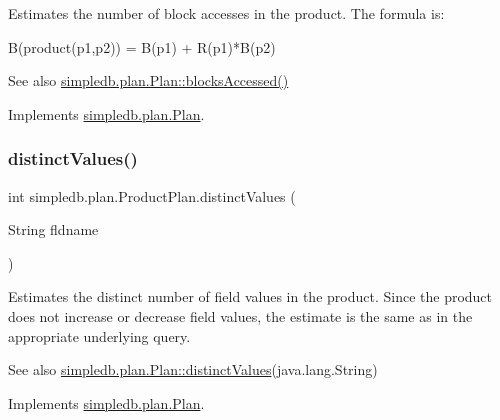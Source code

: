 Estimates the number of block accesses in the product. The formula is\+: 
\begin{DoxyPre} B(product(p1,p2)) = B(p1) + R(p1)*B(p2) \end{DoxyPre}
 \begin{DoxySeeAlso}{See also}
\hyperlink{interfacesimpledb_1_1plan_1_1Plan_a6a333b95b956fe224812155b9d1c8202}{simpledb.\+plan.\+Plan\+::blocks\+Accessed()} 
\end{DoxySeeAlso}


Implements \hyperlink{interfacesimpledb_1_1plan_1_1Plan_a6a333b95b956fe224812155b9d1c8202}{simpledb.\+plan.\+Plan}.

\mbox{\label{classsimpledb_1_1plan_1_1ProductPlan_af15c3dd2da35b2d41ed02e0586603f39}} 
\subsubsection{\texorpdfstring{distinct\+Values()}{distinctValues()}}
{\footnotesize\ttfamily int simpledb.\+plan.\+Product\+Plan.\+distinct\+Values (\begin{DoxyParamCaption}\item[{String}]{fldname }\end{DoxyParamCaption})\hspace{0.3cm}{\ttfamily [inline]}}

Estimates the distinct number of field values in the product. Since the product does not increase or decrease field values, the estimate is the same as in the appropriate underlying query. \begin{DoxySeeAlso}{See also}
\hyperlink{interfacesimpledb_1_1plan_1_1Plan_a55094c16c756b0c09b5c71b94d573271}{simpledb.\+plan.\+Plan\+::distinct\+Values}(java.\+lang.\+String) 
\end{DoxySeeAlso}


Implements \hyperlink{interfacesimpledb_1_1plan_1_1Plan_a55094c16c756b0c09b5c71b94d573271}{simpledb.\+plan.\+Plan}.

\mbox{\label{classsimpledb_1_1plan_1_1ProductPlan_a42d2c091a1b387611af9e960783c0931}} 
